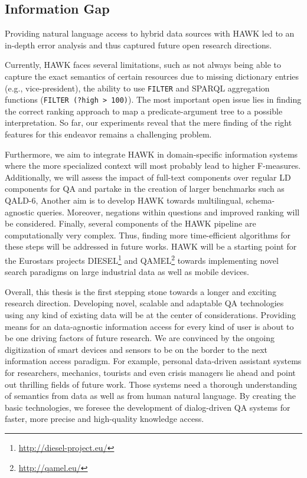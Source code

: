 \subsection*{Information Gap}

Providing natural language access to hybrid data sources with HAWK led to an in-depth error analysis and thus captured future open research directions.

Currently, HAWK faces several limitations, such as not always being able to capture the exact semantics of certain resources due to missing dictionary entries (e.g., vice-president), the ability to use \texttt{FILTER} and SPARQL aggregation functions (\texttt{FILTER (?high > 100)}). 
The most important open issue lies in finding the correct ranking approach to map a predicate-argument tree to a possible interpretation. 
So far, our experiments reveal that the mere finding of the right features for this endeavor remains a challenging problem. 

Furthermore, we aim to integrate HAWK in domain-specific information systems where the more specialized context will most probably lead to higher F-measures. 
Additionally, we will assess the impact of full-text components over regular LD components for \ac{QA} and partake in the creation of larger benchmarks such as \ac{QALD}-6,
Another aim is to develop HAWK towards multilingual, schema-agnostic queries.
Moreover, negations within questions and improved ranking will  be considered. 
Finally, several components of the HAWK pipeline are computationally very complex. 
Thus, finding more time-efficient algorithms for these steps will be addressed in future works.
HAWK will be a starting point for the Eurostars projects DIESEL\footnote{\url{http://diesel-project.eu/}} and QAMEL\footnote{\url{http://qamel.eu/}} towards implementing novel search paradigms on large industrial data as well as mobile devices.

\bigskip

Overall, this thesis is the first stepping stone towards a longer and exciting research direction. 
Developing novel, scalable and adaptable \ac{QA} technologies using any kind of existing data will be at the center of considerations.
Providing means for an data-agnostic information access for every kind of user is about to be one driving factors of future research. 
We are convinced by the ongoing digitization of smart devices and sensors to be on the border to the next information access paradigm.  
For example, personal data-driven assistant systems for researchers, mechanics, tourists and even crisis managers lie  ahead and point out thrilling fields of future work.
Those systems need a thorough understanding of semantics from data as well as from human natural language. 
By creating the basic technologies, we foresee the development of dialog-driven \ac{QA} systems for faster, more precise and high-quality knowledge access.